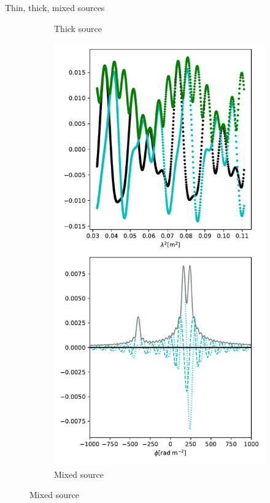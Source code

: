 \documentclass[xetex,aspectratio=169]{beamer}
\begin{document}
\begin{frame}{Thin, thick, mixed sources}
\begin{figure}
\begin{subfigure}{0.2\textwidth}
                \caption{Thick source}
            \end{subfigure}
            \begin{subfigure}{0.2\textwidth}
                \includegraphics[width=\textwidth]{figures/sources/mixed_source.pdf}
                \caption{Mixed source}
            \end{subfigure}
        \end{figure}
        
    \end{frame}
    
\end{document}
